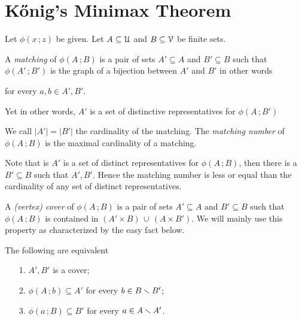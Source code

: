 \documentclass[scombinatorics.tex]{subfiles}
\begin{document}
\section{K\H{o}nig's Minimax Theorem}\label{Konig}


Let $\phi(x\,;z)$ be given. 
Let $A\subseteq\EuScript U$ and $B\subseteq\EuScript V$ be finite sets. 

A \emph{matching\/} of $\phi(A\,;B)$ is a pair of sets $A'\subseteq A$  and $B'\subseteq B$ such that $\phi(A'\,;B')$ is the graph of a bijection between $A'$ and $B'$ in other words

\quad for every $a,b\in A',B'$.

Yet in other words, $A'$ is a set of distinctive representatives for  $\phi(A\,;B')$

We call $|A'|=|B'|$ the cardinality of the matching.
The \emph{matching number} of $\phi(A\,;B)$ is the maximal cardinality of a matching.

Note that is $A'$ is a set of distinct representatives for $\phi(A\,;B)$, then there is a $B'\subseteq B$ such that $A',B'$.
Hence the matching number is less or equal than the cardinality of any set of distinct representatives.


A \emph{(vertex) cover\/} of $\phi(A\,;B)$ is a pair of sets $A'\subseteq A$ and $B'\subseteq B$ such that $\phi(A\,;B)$ is contained in $(A'\times B)\,\cup\, (A\times B')$. We will mainly use this property as characterized by the easy fact below.

\begin{fact}
   The following are equivalent
   \begin{itemize}
      \item[1.] $A',B'$ is a cover;
      \item[2.] $\phi(A\,;b)\subseteq A'$ for every $b\in B\smallsetminus B'$;
      \item[3.] $\phi(a\,;B)\subseteq B'$ for every $a\in A\smallsetminus A'$.\QED
   \end{itemize}
\end{fact}
\end{document}
